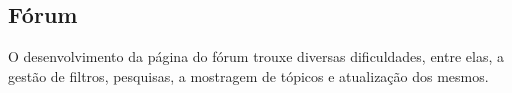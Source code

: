 \subsection{Fórum}
O desenvolvimento da página do fórum trouxe diversas dificuldades, entre elas, a gestão de filtros, pesquisas, a mostragem de tópicos e atualização dos mesmos.

\vspace{10mm}
\begin{figure}[htb]%
 \centering
 \qquad
 \label{fig:72}%
\end{figure}
\vspace{10mm}

\newpage

